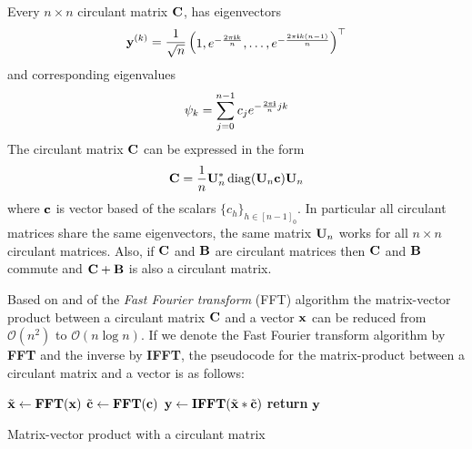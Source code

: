 \begin{theorem}
  Every $n \times n$ circulant matrix $\mathbf{C}$, has eigenvectors  
  \begin{equation}
    \mathbf{y}^{(k)} = \frac{1}{\sqrt{n}} \begin{pmatrix} 1, e^{-\frac{2 \pi \mathbf{i} k}{n}}, \dots, e^{-\frac{2 \pi \mathbf{i} k(n-1)}{n}} \end{pmatrix}^\top
  \end{equation}
  and corresponding eigenvalues
  \begin{equation}
    \psi_k = \sum_{j=0}^{n-1} c_j e^{-\frac{2 \pi \mathbf{i}}{n} jk}
  \end{equation}
  The circulant matrix $\mathbf{C}$ can be expressed in the form 
  \begin{equation}
    \mathbf{C} = \frac{1}{n} \mathbf{U}_n^* \operatorname*{diag}(\mathbf{U}_n \mathbf{c}) \mathbf{U}_n
    \label{equation:ch2-diagonalization_circulant_matrix}
  \end{equation}
  where $\mathbf{c}$ is vector based of the scalars $\{c_h\}_{h \in [n-1]_0}$.
  In particular all circulant matrices share the same eigenvectors, the same matrix $\mathbf{U}_n$ works for all $n \times n$ circulant matrices.
  Also, if $\mathbf{C}$ and $\mathbf{B}$ are circulant matrices then $\mathbf{C}$ and $\mathbf{B}$ commute and $\mathbf{C} + \mathbf{B}$ is also a circulant matrix.
  \label{theorem:ch2-diagonalization_circulant_matrix}
\end{theorem}
\noindent
Based on  and of the \emph{Fast Fourier transform} (FFT) algorithm the matrix-vector product between a circulant matrix $\mathbf{C}$ and a vector $\mathbf{x}$ can be reduced from $\mathcal{O}(n^2)$ to $\mathcal{O}(n \log n)$. 
If we denote the Fast Fourier transform algorithm by \textbf{FFT} and the inverse by \textbf{IFFT}, the pseudocode for the matrix-product between a circulant matrix and a vector is as follows:
\begin{algorithm}[h]
  \begin{algorithmic}[1]
     
      \State $\tilde{\mathbf{x}} \gets \textbf{FFT}(\mathbf{x})$
      \State $\tilde{\mathbf{c}} \gets \textbf{FFT}(\mathbf{c})$
      \State $\mathbf{y} \gets \textbf{IFFT}(\tilde{\mathbf{x}} * \tilde{\mathbf{c}})$ 
      \State \textbf{return} $\mathbf{y}$ 
    \EndProcedure
  \end{algorithmic}
  \caption{Matrix-vector product with a circulant matrix}
  \label{algorithm:ch2-matrix_vector_product_circulant_matrix}
\end{algorithm}

